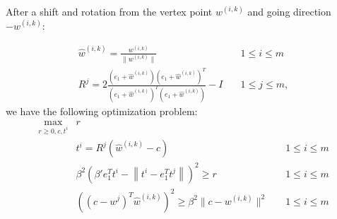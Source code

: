 \documentclass{article}
\newenvironment{comment}
  {\par\medskip
   \color{red}%
   \begin{framed}
   \textbf{Comment: }\ignorespaces}
 {\end{framed}
  \medskip}
\theoremstyle{case}
\newcommand{\wik}{{w^{(i, k)}}}
\begin{document}
After a shift and rotation from the vertex point $\wik$ and going direction $-\wik$:

\begin{align*}
\hat w^{(i,k)} = \frac {\wik} {\|\wik\|} & \quad 1 \le i \le m\\
R^j = 2 \frac{(e_1 + \hat w^{(i,k)})(e_1 + \hat w^{(i,k)})^T}{(e_1 + \hat w^{(i,k)})^T(e_1 + \hat w^{(i,k)})} - I  & \quad 1 \le j \le m,
\end{align*}
we have the following optimization problem:
\begin{align*}
\max_{r \ge 0, c, t^i}	& r & \\
					& t^i = R^j\left(\hat w^{(i,k)} - c\right) 									& \quad 1 \le i \le m \\
					& \beta^2 \left(\beta' e_1^T t^i - \left\|t^i - e_1^T t^j\right\|\right)^2 \ge r			& \quad 1 \le i \le m \\
					& \left(\left(c - w^j\right)^T\hat w^{(i,k)}\right)^2 \ge \beta^2 \|c - \wik\|^2		& \quad 1 \le i \le m
\end{align*}

% 
% 
% 
% 
% 
% 
% 
\end{document}
